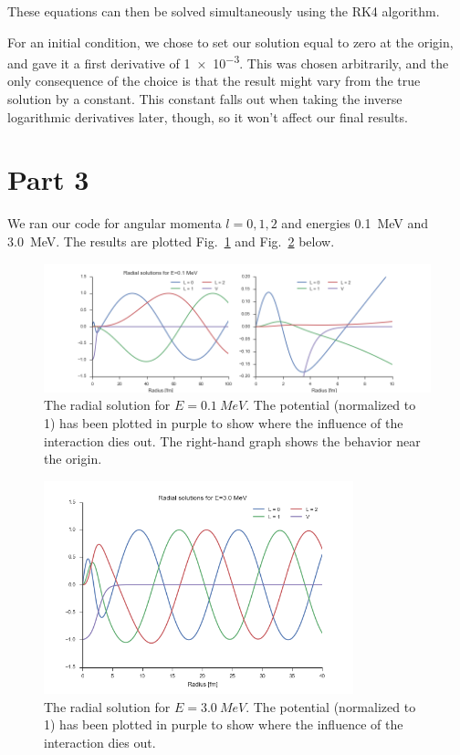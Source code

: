 \documentclass{article}
\begin{document}
These equations can then be solved simultaneously using the RK4 algorithm.

For an initial condition, we chose to set our solution equal to zero at the origin, and gave it a first derivative of \num{1e-3}. This was chosen arbitrarily, and the only consequence of the choice is that the result might vary from the true solution by a constant. This constant falls out when taking the inverse logarithmic derivatives later, though, so it won't affect our final results.

\section*{Part 3}

We ran our code for angular momenta $l=0,1,2$ and energies \SI{0.1}{MeV} and \SI{3.0}{MeV}. The results are plotted Fig.~\ref{fig:u01} and Fig.~\ref{fig:u3} below. 

\begin{figure}
	\centering
	\includegraphics[width=\textwidth]{images/u_e01mev.png}
	\caption{The radial solution for $E=\SI{0.1}{MeV}$. The potential (normalized to 1) has been plotted in purple to show where the influence of the interaction dies out. The right-hand graph shows the behavior near the origin.}
	\label{fig:u01}
\end{figure}

\begin{figure}
	\centering
	\includegraphics[width=0.8\textwidth]{images/u_e3mev.png}
	\caption{The radial solution for $E=\SI{3.0}{MeV}$. The potential (normalized to 1) has been plotted in purple to show where the influence of the interaction dies out.}
	\label{fig:u3}
\end{figure}
\end{document}
